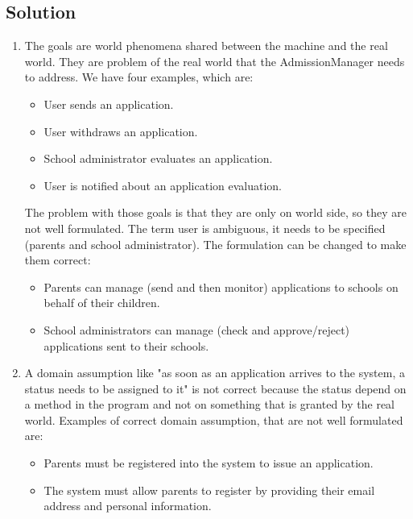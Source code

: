\documentclass[12pt, a4paper]{report}
\newtheorem[style=M,bodystyle=\normalfont]{theorem}{Theorem}
\newtheorem[style=M,bodystyle=\normalfont]{corollary}{Corollary}
\newtheorem[style=M,bodystyle=\normalfont]{lemma}{Lemma}
\newtheorem[style=M,bodystyle=\normalfont]{definition}{Definition}
\begin{document}
    \subsection*{Solution}
        \begin{enumerate}
            \item The goals are world phenomena shared between the machine and the real world. They are problem of the real world that the AdmissionManager needs to address. We have 
                four examples, which are: 
                \begin{itemize}
                    \item User sends an application.
                    \item User withdraws an application.
                    \item School administrator evaluates an application.
                    \item User is notified about an application evaluation. 
                \end{itemize}
                The problem with those goals is that they are only on world side, so they are not well formulated. The term user is ambiguous, it needs to be specified (parents and school 
                administrator). The formulation can be changed to make them correct: 
                \begin{itemize}
                    \item Parents can manage (send and then monitor) applications to schools on behalf of their children.
                    \item School administrators can manage (check and approve/reject) applications sent to their schools.
                \end{itemize}
            \item A domain assumption like "as soon as an application arrives to the system, a status needs to be assigned to it" is not correct because the status depend on a method in 
                the program and not on something that is granted by the real world. Examples of correct domain assumption, that are not well formulated are: 
                \begin{itemize}
                    \item Parents must be registered into the system to issue an application. 
                    \item The system must allow parents to register by providing their email address and personal information.  
                \end{itemize}

\end{enumerate}
\end{document}
